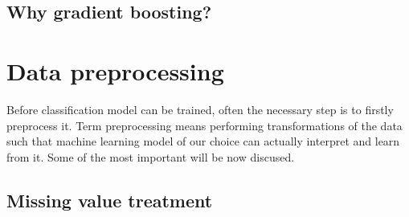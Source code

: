 \documentclass[a4paper,twoside,12pt]{book}
\begin{document}
\subsection{Why gradient boosting?}



\section{Data preprocessing}

Before classification model can be trained, often the necessary step is to firstly preprocess it. Term preprocessing means performing transformations of the data such that machine learning model of our choice can actually interpret and learn from it. Some of the most important will be now discused.

\subsection{Missing value treatment}
\end{document}
